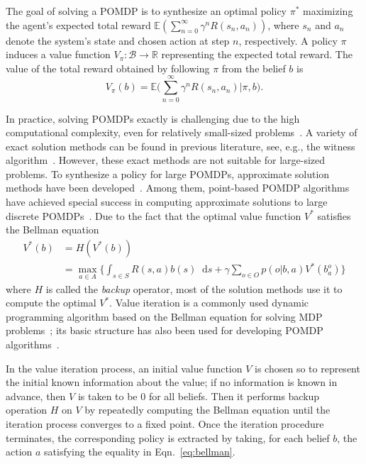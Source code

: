 \documentclass[orivec]{llncs}
\newcommand{\reals}{\mathbb{R}}
\newcommand{\expectation}{\mathbb{E}}
\newcommand{\states}{S}
\newcommand{\actions}{A}
\newcommand{\observables}{O}
\newcommand{\reward}{R}
\newcommand{\discount}{\gamma}
\newcommand{\beliefs}{\mathcal{B}}
\newcommand{\policy}{\pi}
\newcommand{\diff}[1]{\mathop{}\!\mathrm{d}#1}
\begin{document}
The goal of solving a POMDP is to synthesize an optimal policy $\policy^{*}$ maximizing the agent's expected total reward $\expectation(\sum_{n=0}^{\infty} \discount^{n} \reward(s_{n}, a_{n}))$, where $s_{n}$ and $a_{n}$ denote the system's state and chosen action at step $n$, respectively. 
A policy $\policy$ induces a value function $V_{\policy} \colon \beliefs \to \reals$ representing the expected total reward. 
The value of the total reward obtained by following $\policy$ from the belief $b$ is
\begin{equation}
	V_{\policy}(b) = \expectation\big(\sum_{n=0}^{\infty} \discount^{n} \reward(s_{n}, a_{n}) | \policy, b\big).
\end{equation}

In practice, solving POMDPs exactly is challenging due to the high computational complexity, even for relatively small-sized problems~\cite{ASurveyofPBPOMDP}. 
A variety of exact solution methods can be found in previous literature, see, e.g., the witness algorithm~\cite{article1}. 
However, these exact methods are not suitable for large-sized problems. 
To synthesize a policy for large POMDPs, approximate solution methods have been developed~\cite{article2}. 
Among them, point-based POMDP algorithms have achieved special success in computing approximate solutions to large discrete POMDPs~\cite{ASurveyofPBPOMDP,PBVI}. 
Due to the fact that the optimal value function $V^{*}$ satisfies the Bellman equation~\cite{article3}
\begin{equation}
	\begin{aligned}
		V^{*}(b) & = H(V^{*}(b)) \\
		& = \max_{a \in \actions} \Big\{\int_{s \in \states} \reward(s,a) b(s) \diff{s} + \discount \sum_{o \in \observables} p(o | b, a) V^{*}(b^{o}_{a})\Big\}
	\end{aligned}
	\label{eq:bellman}
\end{equation}
where $H$ is called the \emph{backup} operator, most of the solution methods use it to compute the optimal $V^{*}$. 
Value iteration is a commonly used dynamic programming algorithm based on the Bellman equation for solving MDP problems~\cite{RLIntro}; 
its basic structure has also been used for developing POMDP algorithms~\cite{ASurveyofPBPOMDP}. 

In the value iteration process, an initial value function $V$ is chosen so to represent the initial known information about the value;
if no information is known in advance, then $V$ is taken to be $0$ for all beliefs. 
Then it performs backup operation $H$ on $V$ by repeatedly computing the Bellman equation until the iteration process converges to a fixed point. 
Once the iteration procedure terminates, the corresponding policy is extracted by taking, for each belief $b$, the action $a$ satisfying the equality in Eqn.~\ref{eq:bellman}.
\end{document}
